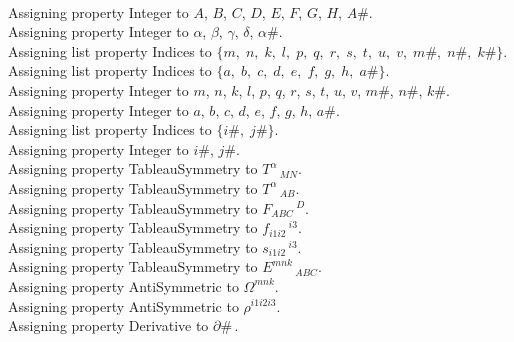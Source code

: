 \documentclass[11pt]{article}
\begin{document}
\\
Assigning property Integer to $A$, $B$, $C$, $D$, $E$, $F$, $G$, $H$, $A\#$.
\\
Assigning property Integer to $\alpha$, $\beta$, $\gamma$, $\delta$, $\alpha\#$.
\\
Assigning list property Indices to $\{m,\; n,\; k,\; l,\; p,\; q,\; r,\; s,\; t,\; u,\; v,\; m\#,\; n\#,\; k\#\}$.
\\
Assigning list property Indices to $\{a,\; b,\; c,\; d,\; e,\; f,\; g,\; h,\; a\#\}$.
\\
Assigning property Integer to $m$, $n$, $k$, $l$, $p$, $q$, $r$, $s$, $t$, $u$, $v$, $m\#$, $n\#$, $k\#$.
\\
Assigning property Integer to $a$, $b$, $c$, $d$, $e$, $f$, $g$, $h$, $a\#$.
\\
Assigning list property Indices to $\{i\#,\; j\#\}$.
\\
Assigning property Integer to $i\#$, $j\#$.
\\
Assigning property TableauSymmetry to ${T}^{\alpha}\,_{M N}$.
\\
Assigning property TableauSymmetry to ${T}^{\alpha}\,_{A B}$.
\\
Assigning property TableauSymmetry to ${F}_{A B C}\,^{D}$.
\\
Assigning property TableauSymmetry to ${f}_{i1 i2}\,^{i3}$.
\\
Assigning property TableauSymmetry to ${s}_{i1 i2}\,^{i3}$.
\\
Assigning property TableauSymmetry to ${E}^{m n k}\,_{A B C}$.
\\
Assigning property AntiSymmetric to ${\Omega}^{m n k}$.
\\
Assigning property AntiSymmetric to ${\rho}^{i1 i2 i3}$.
\\
Assigning property Derivative to $\partial{\#}\, $.
\\
\end{document}
